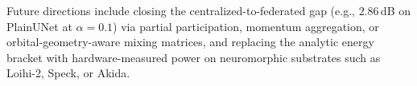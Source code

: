 \documentclass[conference]{IEEEtran}
\begin{document}
Future directions include closing the centralized-to-federated
gap (e.g., $2.86$\,dB on PlainUNet at $\alpha\!=\!0.1$) via partial
participation, momentum aggregation, or orbital-geometry-aware
mixing matrices, and replacing the analytic energy bracket with
hardware-measured power on neuromorphic substrates such as
Loihi-2, Speck, or Akida.

\end{document}
